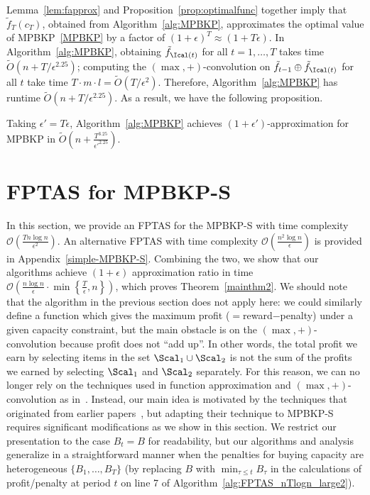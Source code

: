 \documentclass[11pt]{article}
\begin{document}
Lemma~\ref{lem:fapprox} and Proposition~\ref{prop:optimalfunc} together imply that $\tilde{f}_T(c_T)$, obtained from Algorithm~\ref{alg:MPBKP}, approximates the optimal value of MPBKP~\eqref{MPBKP} by a factor of $(1+\epsilon)^T \approx (1+T\epsilon)$. In Algorithm~\ref{alg:MPBKP}, obtaining $\tilde{f}_{\Ical(t)}$ for all $t=1,\ldots,T$ takes time $\tilde{O}\left(n+{T}/{\epsilon^{2.25}}\right)$; computing the $(\max,+)$-convolution on $\tilde{f}_{t-1}\oplus \tilde{f}_{\Ical(t)}$ for all $t$ take time $T\cdot m\cdot l = \tilde{O}\left(T/\epsilon^2\right)$. Therefore, Algorithm~\ref{alg:MPBKP} has runtime $\tilde{O}\left(n+T/\epsilon^{2.25}\right)$. As a result, we have the following proposition. 
\begin{proposition}
Taking $\epsilon' = T\epsilon$, Algorithm~\ref{alg:MPBKP} achieves $(1+\epsilon')$-approximation for MPBKP in $\tilde{O}\left(n+\frac{T^{3.25}}{{\epsilon'}^{2.25}}\right)$.
\end{proposition}


\section{FPTAS for MPBKP-S}\label{sec:approx2}

In this section, we provide an FPTAS for the MPBKP-S with time complexity $\mathcal{O}\left(\frac{Tn\log n}{\epsilon^2}\right)$. An alternative FPTAS with time complexity $\mathcal{O}\left(\frac{n^2\log n}{\epsilon}\right)$ is provided in Appendix~\ref{simple-MPBKP-S}. Combining the two, we show that our algorithms achieve $(1+\epsilon)$ approximation ratio in time $\mathcal{O}\left(\frac{n\log n}{\epsilon}\cdot\min\left\{\frac{T}{\epsilon},n\right\}\right)$, which proves Theorem~\ref{mainthm2}. 
We should note that the algorithm in the previous section does not apply here: we could similarly define a function which gives the maximum profit ($=$reward$-$penalty) under a given capacity constraint, but the main obstacle is on the $(\max,+)$-convolution because profit does not ``add up''. In other words, the total profit we earn by selecting items in the set $\Scal_1\cup\Scal_2$ is not the sum of the profits we earned by selecting $\Scal_1$ and $\Scal_2$ separately. For this reason, we can no longer rely on the techniques used in function approximation and $(\max,+)$-convolution as in~\cite{chan:OASIcs:2018:8299,jin:LIPIcs:2019:10652}. Instead, our main idea is motivated by the techniques that originated from earlier papers~\citep{ibarra1975fast,lawler1979fast}, but adapting their technique to MPBKP-S requires significant modifications as we show in this section. %
We restrict our presentation to the case $B_t =B$ for readability, but our algorithms and analysis generalize in a straightforward manner when the penalties for buying capacity are heterogeneous $\{B_1, \ldots, B_T\}$ (by replacing $B$ with $\min_{\tau\le t}B_\tau$ in the calculations of profit/penalty at period $t$ on line 7 of Algorithm~\ref{alg:FPTAS_nTlogn_large2}).
\end{document}
